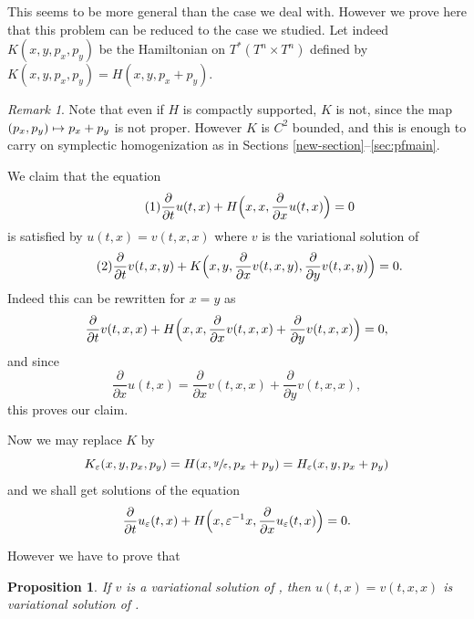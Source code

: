 \documentclass[JEP,XML,SOM,NoFloatCountersInSection,Unicode,published]{cedram}
\newcommand\mto{\mathchoice{\longmapsto}{\mapsto}{\mapsto}{\mapsto}}
\numberwithin{equation}{section}
\theoremstyle{plain}
\newtheorem{proposition}[theorem]{Proposition}
\theoremstyle{definition}
\theoremstyle{remark}
\newtheorem{remark}[theorem]{Remark}
\begin{document}
This seems to be more general than the case we deal with. However we prove here that this problem can be reduced to the case we studied.
Let indeed $K(x,y,p_{x},p_{y})$ be the Hamiltonian on $T^*(T^n\times T^n)$ defined by $K(x, y,p_{x},p_{y})=H(x,y,p_{x}+p_{y})$.

\begin{remark}
Note that even if $H$ is compactly supported, $K$ is not, since the map $(p_x,p_y) \mto p_x+p_y$ is not proper. However $ K$ is $C^2$ bounded, and this is enough to carry on symplectic homogenization as in Sections \ref{new-section}--\ref{sec:pfmain}.
\end{remark}

We claim that the equation
\begin{equation*}
\tag{1} \frac{\partial}{\partial t} u (t,x) + H \Bigl(x, x, \frac{\partial}{\partial x}u (t,x)\Bigr) = 0 
\end{equation*}
is satisfied by $u(t,x)=v(t,x,x)$ where $v$ is the variational solution of
\begin{equation*}
\tag{2}
\frac{\partial}{\partial t} v(t,x,y) + K \Bigl(x, y, \frac{\partial}{\partial x}v (t,x,y), \frac{\partial}{\partial y}v (t,x,y)\Bigr) = 0.
\end{equation*}
Indeed this can be rewritten for $x=y$ as
\[
\frac{\partial}{\partial t} v (t,x,x) + H \Bigl(x, x, \frac{\partial}{\partial x}v (t,x,x)+\frac{\partial}{\partial y}v (t,x,x)\Bigr) = 0,
\]
and since
\[
\frac{\partial}{\partial x}u (t,x)= \frac{\partial}{\partial x}v (t,x,x) + \frac{\partial}{\partial y}v (t,x,x),
\]
this proves our claim.

Now we may replace $K$ by
\[
K_\varepsilon (x,y,p_x,p_y)=H(x,\sfrac{y}{\varepsilon},p_x+p_y)=H_\varepsilon (x,y,p_x+p_y)
\]
and we shall get solutions of the equation
\[
\frac{\partial}{\partial t} u_\varepsilon (t,x) + H \Bigl(x, \varepsilon^{-1}x, \frac{\partial}{\partial x}u_\varepsilon (t,x)\Bigr) = 0.
\]

However we have to prove that

\begin{proposition}
If $v$ is a variational solution of , then $u(t,x)=v(t,x,x)$ is variational solution of
.
\end{proposition}
\end{document}
